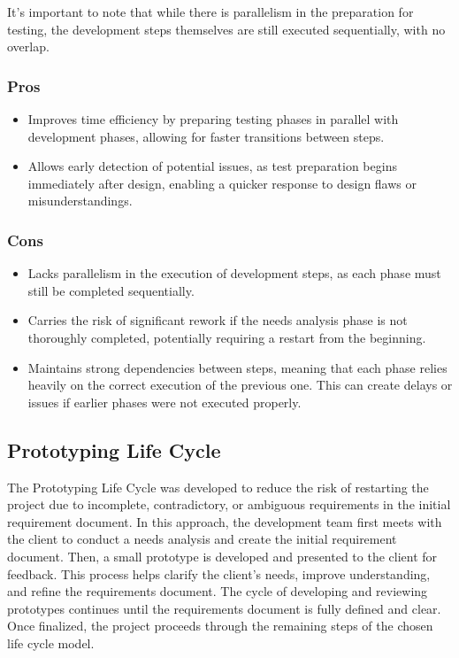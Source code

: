 \vspace{1cm}
\begin{tcolorbox}[title = Note]
 It's important to note that while there is parallelism in the preparation for testing, the development steps themselves are 
still executed sequentially, with no overlap.  
\end{tcolorbox}

\vspace{0.5cm}
\subsubsection{Pros}
\begin{itemize}
    \item Improves time efficiency by preparing testing phases in parallel with development phases, allowing for faster transitions between steps.
    \item Allows early detection of potential issues, as test preparation begins immediately after design, enabling a quicker response to design flaws or misunderstandings.
\end{itemize}

\subsubsection{Cons}
\begin{itemize}
    \item Lacks parallelism in the execution of development steps, as each phase must still be completed sequentially.
    \item Carries the risk of significant rework if the needs analysis phase is not thoroughly completed, potentially requiring a restart from the beginning.
    \item Maintains strong dependencies between steps, meaning that each phase relies heavily on the correct execution of the previous one. This can create delays or issues if earlier phases were not executed properly.
\end{itemize}

\vspace{1cm}
\subsection{Prototyping Life Cycle}
The Prototyping Life Cycle was developed to reduce the risk of restarting the project due to incomplete, contradictory, 
or ambiguous requirements in the initial requirement document. 
In this approach, the development team first meets with the client to conduct a needs analysis and create the initial 
requirement document. Then, a small prototype is developed and presented to the client for feedback. This process helps
clarify the client's needs, improve understanding, and refine the requirements document. 
The cycle of developing and reviewing prototypes continues until the requirements document is fully defined and clear. 
Once finalized, the project proceeds through the remaining steps of the chosen life cycle model.


